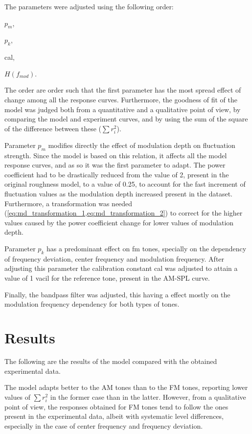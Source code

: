 \documentclass[../main.tex]{subfiles}
\begin{document}
\begin{modelchapter}
The parameters were adjusted using the following order:
\begin{inparaenum}[(1)]
  \item $p_m$,
  \item $p_k$,
  \item cal,
  \item $H(f_{mod})$.
\end{inparaenum}
The order are order such that the first parameter has the most spread effect
of change among all the response curves. Furthermore, the goodness of fit of the
model was judged both from a quantitative and a qualitative point of view, by
comparing the model and experiment curves, and by using the sum of the square of
the difference between these ($\sum r_i^2$).

Parameter $p_m$ modifies directly the effect of modulation depth on fluctuation
strength. Since the model is based on this relation, it affects all the model
response curves, and as so it was the first parameter to adapt. The power
coefficient had to be drastically reduced from the value of 2, present in the
original roughness model, to a value of 0.25, to account for the fast increment
of fluctuation values as the modulation depth increased present in the dataset.
Furthermore, a transformation was needed
(\cref{eq:md_transformation_1,eq:md_transformation_2}) to correct for the higher
values caused by the power coefficient change for lower values of
modulation depth.

Parameter $p_k$ has a predominant effect on \gls{fm} tones, specially on the
dependency of frequency deviation, center frequency and modulation frequency.
After adjusting this parameter the calibration constant cal was adjusted to
attain a value of 1 vacil for the reference tone, present in the AM-SPL curve.

Finally, the bandpass filter was adjusted, this having a effect mostly on the
modulation frequency dependency for both types of tones.

\section{Results}

The following are the results of the model compared with the obtained
experimental data.


The model adapts better to the AM tones than to the FM tones, reporting lower
values of $\sum r_i^2$ in the former case than in the latter. However, from a
qualitative point of view, the responses obtained for FM tones tend to follow
the ones present in the experimental data, albeit with systematic level
differences, especially in the case of center frequency and frequency deviation.

\end{modelchapter}
\end{document}
